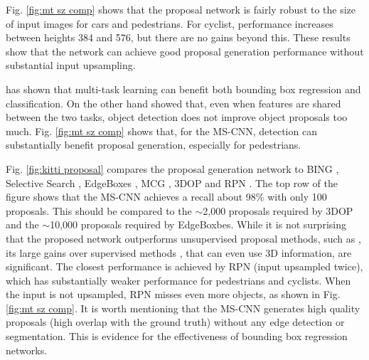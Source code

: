 \documentclass[runningheads]{llncs}
\begin{document}
Fig. \ref{fig:mt sz comp} shows that the proposal network is fairly robust
to the size of input images for cars and pedestrians. For cyclist,
performance increases between heights 384 and 576, but there are no gains
beyond this. These results show that the network can achieve good proposal
generation performance without substantial input upsampling.

\cite{DBLP:conf/iccv/Girshick15} has shown that multi-task learning
can benefit both bounding box regression and classification. On the other
hand \cite{DBLP:conf/nips/shaoqing15fasterRcnn} showed that,
even when features are shared between the two tasks,
object detection does not improve object proposals too much.
Fig. \ref{fig:mt sz comp} shows that, for the MS-CNN, detection
can substantially benefit proposal generation, especially for pedestrians.

Fig. \ref{fig:kitti proposal} compares the proposal generation network
to BING \cite{DBLP:conf/cvpr/ChengZLT14}, Selective
Search \cite{DBLP:conf/iccv/SandeUGS11},
EdgeBoxes \cite{DBLP:conf/eccv/ZitnickD14},
MCG \cite{DBLP:conf/cvpr/ArbelaezPBMM14},
3DOP \cite{DBLP:conf/nips/XiaozhiNIPS15} and
RPN \cite{DBLP:conf/nips/shaoqing15fasterRcnn}. The top row of the
figure shows that the MS-CNN achieves a recall about 98\%
with only 100 proposals. This should be compared to the $\sim$2,000 proposals
required by 3DOP and the $\sim$10,000 proposals required by EdgeBoxbes.
While it is not surprising that the proposed network outperforms
unsupervised proposal methods, such
as \cite{DBLP:conf/iccv/SandeUGS11,DBLP:conf/eccv/ZitnickD14,DBLP:conf/cvpr/ArbelaezPBMM14}, its large gains over supervised
methods \cite{DBLP:conf/cvpr/ChengZLT14,DBLP:conf/nips/XiaozhiNIPS15},
that can even use 3D information, are significant. The closest
performance is achieved by RPN (input upsampled twice), which has
substantially weaker performance for pedestrians and cyclists.
When the input is not upsampled, RPN misses even more objects, as shown in
Fig. \ref{fig:mt sz comp}. It is worth mentioning that the MS-CNN generates
high quality proposals (high overlap with the ground truth)
without any edge detection or segmentation. This is
evidence for the effectiveness of bounding box regression networks.
\end{document}
